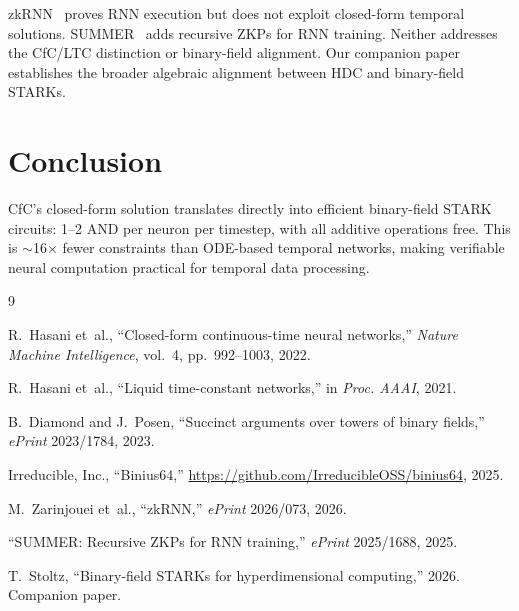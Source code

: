 \documentclass[11pt]{article}
\begin{document}
zkRNN~\cite{zkrnn2026} proves RNN execution but does not exploit closed-form temporal solutions. SUMMER~\cite{summer2025} adds recursive ZKPs for RNN training. Neither addresses the CfC/LTC distinction or binary-field alignment. Our companion paper~\cite{binius_hdc} establishes the broader algebraic alignment between HDC and binary-field STARKs.

\section{Conclusion}

CfC's closed-form solution translates directly into efficient binary-field STARK circuits: 1--2 AND per neuron per timestep, with all additive operations free. This is $\sim$16$\times$ fewer constraints than ODE-based temporal networks, making verifiable neural computation practical for temporal data processing.


\begin{thebibliography}{9}

R.~Hasani et~al., ``Closed-form continuous-time neural networks,'' \emph{Nature Machine Intelligence}, vol.~4, pp.~992--1003, 2022.

R.~Hasani et~al., ``Liquid time-constant networks,'' in \emph{Proc. AAAI}, 2021.

B.~Diamond and J.~Posen, ``Succinct arguments over towers of binary fields,'' \emph{ePrint} 2023/1784, 2023.

Irreducible, Inc., ``Binius64,'' \url{https://github.com/IrreducibleOSS/binius64}, 2025.

M.~Zarinjouei et~al., ``zkRNN,'' \emph{ePrint} 2026/073, 2026.

``SUMMER: Recursive ZKPs for RNN training,'' \emph{ePrint} 2025/1688, 2025.

T.~Stoltz, ``Binary-field STARKs for hyperdimensional computing,'' 2026. Companion paper.

\end{thebibliography}
\end{document}
